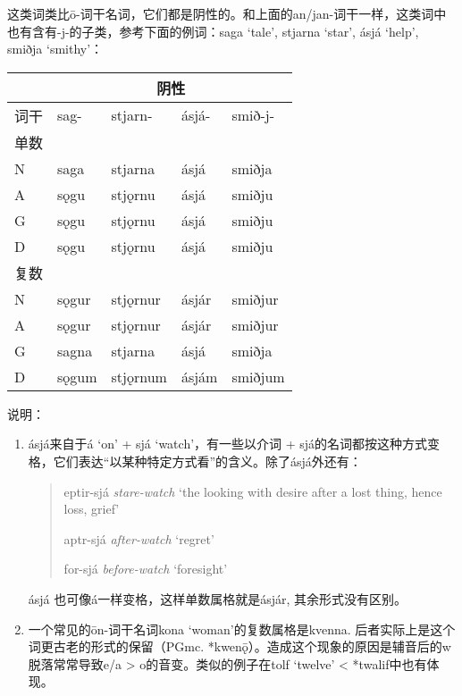 这类词类比ō-词干名词，它们都是阴性的。和上面的an/jan-词干一样，这类词中也有含有-j-的子类，参考下面的例词：saga
`tale', stjarna `star', ásjá `help', smiðja `smithy'：

\begin{longtable}{lllll}
  \toprule
     & \multicolumn{4}{c}{\textbf{阴性}}                              \\
  \midrule
  \endhead
  \bottomrule
  \endfoot
  词干 & sag-                            & stjarn-  & ásjá- & smið-j- \\
  单数 &                                 &          &       &         \\
  N  & saga                            & stjarna  & ásjá  & smiðja  \\
  A  & sǫgu                            & stjǫrnu  & ásjá  & smiðju  \\
  G  & sǫgu                            & stjǫrnu  & ásjá  & smiðju  \\
  D  & sǫgu                            & stjǫrnu  & ásjá  & smiðju  \\
  复数 &                                 &          &       &         \\
  N  & sǫgur                           & stjǫrnur & ásjár & smiðjur \\
  A  & sǫgur                           & stjǫrnur & ásjár & smiðjur \\
  G  & sagna                           & stjarna  & ásjá  & smiðja  \\
  D  & sǫgum                           & stjǫrnum & ásjám & smiðjum \\
\end{longtable}

说明：

\begin{enumerate}
  \item
        ásjá来自于á `on' + sjá `watch'，有一些以介词 +
        sjá的名词都按这种方式变格，它们表达``以某种特定方式看''的含义。除了ásjá外还有：
        \begin{quote}
          eptir-sjá \emph{stare-watch} `the looking with desire after a lost
          thing, hence loss, grief'

          aptr-sjá \emph{after-watch} `regret'

          for-sjá \emph{before-watch} `foresight'

        \end{quote}
        ásjá 也可像á一样变格，这样单数属格就是ásjár, 其余形式没有区别。
  \item
        一个常见的ōn-词干名词kona `woman'的复数属格是kvenna.
        后者实际上是这个词更古老的形式的保留（PGmc.
        *kwenǭ）。造成这个现象的原因是辅音后的w脱落常常导致e/a >
        o的音变。类似的例子在tolf `twelve' < *twalif中也有体现。
\end{enumerate}

